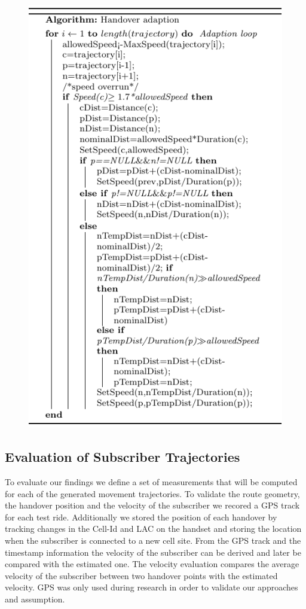 \begin{figure}
\centering
\includegraphics{./adaptionalg}
\caption{}
\label{alg:adaption}
\end{figure}


\subsection{Evaluation of Subscriber Trajectories}
To evaluate our findings we define a set of measurements that will be computed for each of the generated movement trajectories. To validate the route geometry, the handover position and the velocity of the subscriber we recored a GPS track for each test ride. Additionally we stored the position of each handover by tracking changes in the Cell-Id and LAC on the handset and storing the location when the subscriber is connected to a new cell site. From the GPS track and the timestamp information the velocity of the subscriber can be derived and later be compared with the estimated one. The velocity evaluation compares  the average velocity of the subscriber between two handover points with the estimated velocity. GPS was only used during research in order to validate our approaches and assumption.

